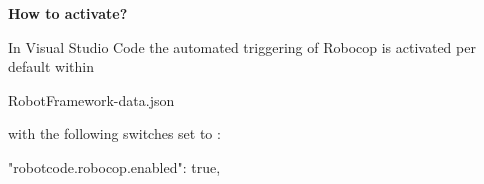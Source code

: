 \vspace{2ex}

\textbf{How to activate?}

In Visual Studio Code the automated triggering of Robocop is activated per default within

\begin{robotlog}
RobotFramework\robotvscode\data\user-data\User\settings.json
\end{robotlog}

with the following switches set to :

\begin{pythoncode}
"robotcode.robocop.enabled": true,
\end{pythoncode}

